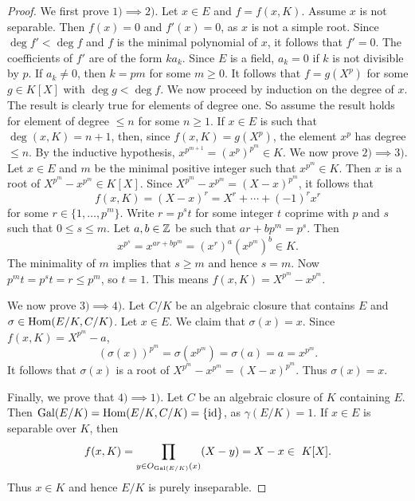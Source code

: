 \begin{proof}
    We first prove $1)\implies 2)$. 
    Let $x\in E$ and $f=f(x,K)$. Assume $x$ is not separable. Then
    $f(x)=0$ and $f'(x)=0$, as $x$ is not a simple root. Since $\deg f'<\deg f$
    and $f$ is the minimal polynomial of $x$, it follows that 
    $f'=0$. The coefficients of $f'$ are of the form $ka_k$. 
    Since $E$ is a field, $a_k=0$ if $k$ is not divisible by $p$. If $a_k\ne 0$, 
    then $k=pm$ for some $m\geq0$. It follows that $f=g(X^p)$
    for some $g\in K[X]$ with $\deg g<\deg f$. 
    We now proceed by induction on the degree of $x$. The result
    is clearly true for elements of degree one. So assume the result holds for element of degree $\leq n$ 
    for some $n\geq1$. 
    If $x\in E$ is such that $\deg(x,K)=n+1$, then, since $f(x,K)=g(X^p)$, the element 
    $x^p$ has degree $\leq n$. By the inductive hypothesis, $x^{p^{m+1}}=(x^p)^{p^m}\in K$.  
    We now prove $2)\implies 3)$. Let $x\in E$ and $m$ be the minimal positive integer 
    such that $x^{p^m}\in K$. Then
    $x$ is a root of $X^{p^m}-x^{p^m}\in K[X]$. Since 
    $X^{p^m}-x^{p^m}=(X-x)^{p^m}$, it follows that 
    \[
    f(x,K)=(X-x)^r=X^r+\cdots+(-1)^rx^r
    \]
    for some
    $r\in\{1,\dots,p^m\}$. Write $r=p^st$ for some integer $t$ coprime with $p$ and $s$ such that
    $0\leq s\leq m$. Let $a,b\in\mathbb{Z}$ be such that $ar+bp^m=p^s$. Then 
    \[
    x^{p^s}=x^{ar+bp^m}=\left(x^r\right)^a\left(x^{p^m}\right)^b\in K.
    \]
    The minimality of $m$ implies that $s\geq m$ and hence $s=m$. Now $p^mt=p^st=r\leq p^m$, so $t=1$. 
    This means $f(x,K)=X^{p^m}-x^{p^m}$. 
    
    We now prove $3)\implies 4)$. Let $C/K$ be an algebraic closure that contains $E$
    and $\sigma\in\operatorname{Hom}(E/K,C/K)$. Let $x\in E$. We claim that $\sigma(x)=x$. Since 
    $f(x,K)=X^{p^m}-a$, 
    \[
    \left(\sigma(x)\right)^{p^m}=\sigma\left(x^{p^m}\right)=\sigma(a)=a=x^{p^m}.
    \]
    It follows that $\sigma(x)$ is a root of $X^{p^m}-x^{p^m}=(X-x)^{p^m}$. 
    Thus $\sigma(x)=x$. 
    
    Finally, we prove that $4)\implies1)$. Let 
    $C$ be an algebraic closure of $K$ containing $E$. 
    Then $\operatorname{Gal}(E/K)=\operatorname{Hom}(E/K,C/K)=\{\operatorname{id}\}$, as $\gamma(E/K)=1$. 
    If $x\in E$ is separable over $K$, then
    \[
    f(x,K)=\prod_{y\in O_{\operatorname{Gal}(E/K)}(x)}(X-y)=X-x\in\ K[X].
    \]
    Thus $x\in K$ and hence $E/K$ is purely inseparable. 
\end{proof}

